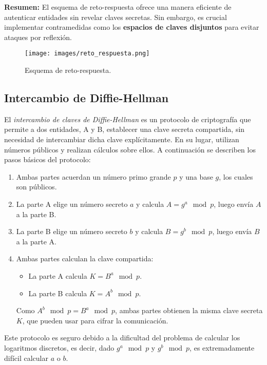 \documentclass[a4paper,12pt]{article}
\begin{document}
\textbf{Resumen:} El esquema de reto-respuesta ofrece una manera eficiente de autenticar entidades sin revelar claves secretas. Sin embargo, es crucial implementar contramedidas como los \textbf{espacios de claves disjuntos} para evitar ataques por reflexión.

\begin{figure}[H]
    \centering
    \texttt{[image: images/reto\_respuesta.png]}
    \caption{Esquema de reto-respuesta.}
\end{figure}

\subsection{Intercambio de Diffie-Hellman}

El \textit{intercambio de claves de Diffie-Hellman} es un protocolo de criptografía que permite a dos entidades, A y B, establecer una clave secreta compartida, sin necesidad de intercambiar dicha clave explícitamente. En su lugar, utilizan números públicos y realizan cálculos sobre ellos. A continuación se describen los pasos básicos del protocolo:

\begin{enumerate}
    \item Ambas partes acuerdan un número primo grande \( p \) y una base \( g \), los cuales son públicos.
    \item La parte A elige un número secreto \( a \) y calcula \( A = g^a \mod p \), luego envía \( A \) a la parte B.
    \item La parte B elige un número secreto \( b \) y calcula \( B = g^b \mod p \), luego envía \( B \) a la parte A.
    \item Ambas partes calculan la clave compartida:
    \begin{itemize}
        \item La parte A calcula \( K = B^a \mod p \).
        \item La parte B calcula \( K = A^b \mod p \).
    \end{itemize}
    Como \( A^b \mod p = B^a \mod p \), ambas partes obtienen la misma clave secreta \( K \), que pueden usar para cifrar la comunicación.
\end{enumerate}

Este protocolo es seguro debido a la dificultad del problema de calcular los logaritmos discretos, es decir, dado \( g^a \mod p \) y \( g^b \mod p \), es extremadamente difícil calcular \( a \) o \( b \).
\end{document}
